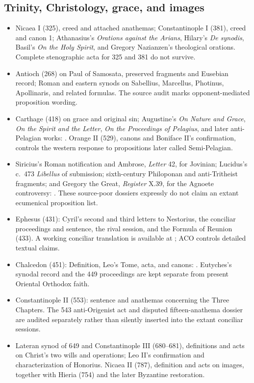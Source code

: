 \subsection{Trinity, Christology, grace, and images}

\begin{itemize}
  \item Nicaea I (325), creed and attached anathemas; Constantinople I (381), creed and canon 1; Athanasius's \emph{Orations against the Arians}, Hilary's \emph{De synodis}, Basil's \emph{On the Holy Spirit}, and Gregory Nazianzen's theological orations. Complete stenographic acta for 325 and 381 do not survive.
  \item Antioch (268) on Paul of Samosata, preserved fragments and Eusebian record; Roman and eastern synods on Sabellius, Marcellus, Photinus, Apollinaris, and related formulas. The source audit marks opponent-mediated proposition wording.
  \item Carthage (418) on grace and original sin; Augustine's \emph{On Nature and Grace}, \emph{On the Spirit and the Letter}, \emph{On the Proceedings of Pelagius}, and later anti-Pelagian works: . Orange II (529), canons and Boniface II's confirmation, controls the western response to propositions later called Semi-Pelagian.
  \item Siricius's Roman notification and Ambrose, \emph{Letter} 42, for Jovinian; Lucidus's c.~473 \emph{Libellus} of submission; sixth-century Philoponan and anti-Tritheist fragments; and Gregory the Great, \emph{Register} X.39, for the Agnoete controversy: . These source-poor dossiers expressly do not claim an extant ecumenical proposition list.
  \item Ephesus (431): Cyril's second and third letters to Nestorius, the conciliar proceedings and sentence, the rival session, and the Formula of Reunion (433). A working conciliar translation is available at ; ACO controls detailed textual claims.
  \item Chalcedon (451): Definition, Leo's Tome, acta, and canons: . Eutyches's synodal record and the 449 proceedings are kept separate from present Oriental Orthodox faith.
  \item Constantinople II (553): sentence and anathemas concerning the Three Chapters. The 543 anti-Origenist act and disputed fifteen-anathema dossier are audited separately rather than silently inserted into the extant conciliar sessions.
  \item Lateran synod of 649 and Constantinople III (680--681), definitions and acts on Christ's two wills and operations; Leo II's confirmation and characterization of Honorius. Nicaea II (787), definition and acts on images, together with Hieria (754) and the later Byzantine restoration.
\end{itemize}


